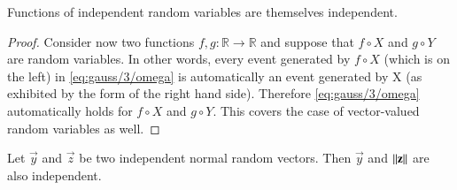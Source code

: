 \begin{lemma}
    Functions of independent random variables are themselves independent.
    \end{lemma}
    \begin{proof}
     Consider now two functions $f,g:\mathbb{R}\rightarrow \mathbb{R}$ and suppose that $f\circ X$ and $g\circ Y$ are random variables. 
    In other words, every event generated by $f\circ X$ (which is on the left) in         \eqref{eq:gauss/3/omega} is automatically an event generated by X (as exhibited by the form of the right hand side). Therefore         \eqref{eq:gauss/3/omega} automatically holds for $f\circ X$ and $g\circ Y$.
    This covers the case of vector-valued random variables as well.
    \end{proof}
    \begin{corollary}
        Let $\vec{y}$ and $\vec{z}$ be two independent normal random vectors. Then $\vec{y}$ and $\mathbf{\left\lVert z\right\rVert}$ are also independent.
    \end{corollary}

